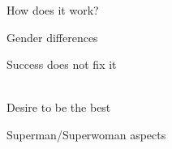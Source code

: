 \documentclass[aspectratio=169]{beamer}
\begin{document}
\begin{frame}
  \begin{center}
    \Huge How does it work?
    \\ \small \cite{hh15}
  \end{center}
\end{frame}

\begin{frame}
  \begin{center}
    \Huge Gender differences
    \\ \small \cite{clanceimes78}
  \end{center}
\end{frame}

\begin{frame}
  \begin{center}
    \Huge Success does not fix it
    \\ \small \cite{clanceimes78}
    \\ \small \cite{sakulku11}
  \end{center}
\end{frame}

\begin{frame}
  \begin{center}
    \Huge Desire to be the best
    \\ \small \cite{sakulku11}
  \end{center}
\end{frame}

\begin{frame}
  \begin{center}
    \Huge Superman/Superwoman aspects
    \\ \small \cite{sakulku11}
  \end{center}
\end{frame}
\end{document}
